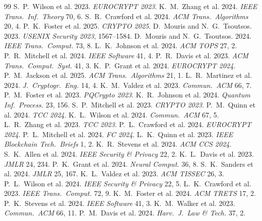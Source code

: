 \documentclass[sigconf,nonacm]{acmart}
\begin{document}
\begin{thebibliography}{99}
 S.~P.~Wilson et al. 2023. \textit{EUROCRYPT 2023}.
 K.~M.~Zhang et al. 2024. \textit{IEEE Trans.\ Inf.\ Theory} 70, 6.
 S.~R.~Crawford et al. 2024. \textit{ACM Trans.\ Algorithms} 20, 4.
 P.~K.~Foster et al. 2025. \textit{CRYPTO 2025}.
 D.~Mouris and N.~G.~Tsoutsos. 2023. \textit{USENIX Security 2023}, 1567--1584.
 D.~Mouris and N.~G.~Tsoutsos. 2024. \textit{IEEE Trans.\ Comput.} 73, 8.
 L.~K.~Johnson et al. 2024. \textit{ACM TOPS} 27, 2.
 P.~R.~Mitchell et al. 2024. \textit{IEEE Software} 41, 4.
 P.~R.~Davis et al. 2023. \textit{ACM Trans.\ Comput.\ Syst.} 41, 3.
 K.~P.~Grant et al. 2024. \textit{EUROCRYPT 2024}.
 P.~M.~Jackson et al. 2025. \textit{ACM Trans.\ Algorithms} 21, 1.
 L.~R.~Martinez et al. 2024. \textit{J.\ Cryptogr.\ Eng.} 14, 4.
 K.~M.~Valdez et al. 2023. \textit{Commun.\ ACM} 66, 7.
 P.~M.~Foster et al. 2023. \textit{PQCrypto 2023}.
 K.~R.~Johnson et al. 2024. \textit{Quantum Inf.\ Process.} 23, 156.
 S.~P.~Mitchell et al. 2023. \textit{CRYPTO 2023}.
 P.~M.~Quinn et al. 2024. \textit{TCC 2024}.
 K.~L.~Wilson et al. 2024. \textit{Commun.\ ACM} 67, 5.
 L.~R.~Zhang et al. 2023. \textit{TCC 2023}.
 P.~L.~Crawford et al. 2024. \textit{EUROCRYPT 2024}.
 P.~L.~Mitchell et al. 2024. \textit{FC 2024}.
 L.~K.~Quinn et al. 2023. \textit{IEEE Blockchain Tech.\ Briefs} 1, 2.
 K.~R.~Stevens et al. 2024. \textit{ACM CCS 2024}.
 S.~K.~Allen et al. 2024. \textit{IEEE Security \& Privacy} 22, 2.
 K.~L.~Davis et al. 2023. \textit{JMLR} 24, 234.
 P.~K.~Grant et al. 2024. \textit{Neural Comput.} 36, 8.
 S.~K.~Sanders et al. 2024. \textit{JMLR} 25, 167.
 K.~L.~Valdez et al. 2023. \textit{ACM TISSEC} 26, 3.
 P.~L.~Wilson et al. 2024. \textit{IEEE Security \& Privacy} 22, 5.
 L.~K.~Crawford et al. 2023. \textit{IEEE Trans.\ Comput.} 72, 9.
 K.~M.~Foster et al. 2024. \textit{ACM TRETS} 17, 2.
 P.~K.~Stevens et al. 2024. \textit{IEEE Software} 41, 3.
 K.~M.~Walker et al. 2023. \textit{Commun.\ ACM} 66, 11.
 P.~M.~Davis et al. 2024. \textit{Harv.\ J.\ Law \& Tech.} 37, 2.
\end{thebibliography}
\end{document}
